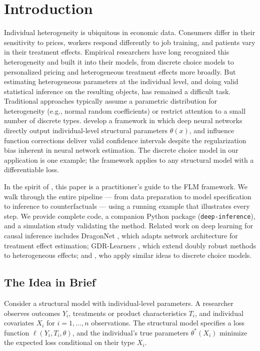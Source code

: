 \section{Introduction}\label{sec:intro}

Individual heterogeneity is ubiquitous in economic data. Consumers differ in their sensitivity to prices, workers respond differently to job training, and patients vary in their treatment effects. Empirical researchers have long recognized this heterogeneity and built it into their models, from discrete choice models \citep{mcfadden1974conditional, train2009discrete} to personalized pricing \citep{dube2023personalized} and heterogeneous treatment effects more broadly. But estimating heterogeneous parameters at the individual level, and doing valid statistical inference on the resulting objects, has remained a difficult task. Traditional approaches typically assume a parametric distribution for heterogeneity (e.g., normal random coefficients) or restrict attention to a small number of discrete types. \citet{farrell2021deep, farrell2025deep} develop a framework in which deep neural networks directly output individual-level structural parameters $\theta(x)$, and influence function corrections deliver valid confidence intervals despite the regularization bias inherent in neural network estimation. The discrete choice model in our application is one example; the framework applies to any structural model with a differentiable loss.

In the spirit of \citet{nevo2000practitioner}, this paper is a practitioner's guide to the FLM framework. We walk through the entire pipeline --- from data preparation to model specification to inference to counterfactuals --- using a running example that illustrates every step. We provide complete code, a companion Python package (\texttt{deep-inference}), and a simulation study validating the method. Related work on deep learning for causal inference includes DragonNet \citep{shi2019dragonnet}, which adapts network architecture for treatment effect estimation; GDR-Learners \citep{melnychuk2026gdr}, which extend doubly robust methods to heterogeneous effects; and \citet{hetzenecker2024deep}, who apply similar ideas to discrete choice models.

\subsection{The Idea in Brief}

Consider a structural model with individual-level parameters. A researcher observes outcomes $Y_i$, treatments or product characteristics $T_i$, and individual covariates $X_i$ for $i = 1, \ldots, n$ observations. The structural model specifies a loss function $\ell(Y_i, T_i, \theta)$, and the individual's true parameters $\theta^*(X_i)$ minimize the expected loss conditional on their type $X_i$.

